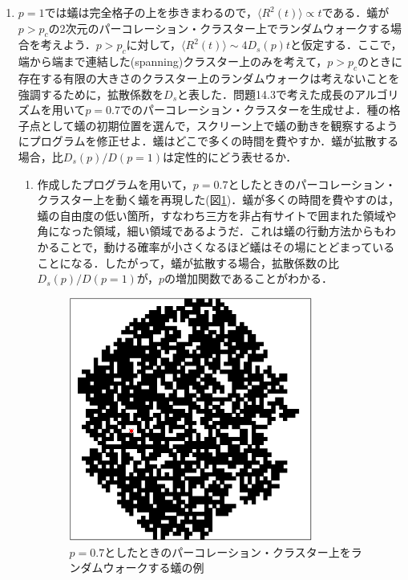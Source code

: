\documentclass{jsarticle}
\begin{document}
    \begin{enumerate}
        \renewcommand{\labelenumi}{\alph{enumi}.}
        \renewcommand{\labelenumii}{}
        
        \item $p=1$では蟻は完全格子の上を歩きまわるので，$\langle R^{2}(t) \rangle \propto t$である．蟻が$p>p_{c}$の2次元のパーコレーション・クラスター上でランダムウォークする場合を考えよう．$p>p_{c}$に対して，$\langle R^{2}(t) \rangle \sim 4D_{s}(p)t$と仮定する．ここで，端から端まで連結した(spanning)クラスター上のみを考えて，$p>p_{c}$のときに存在する有限の大きさのクラスター上のランダムウォークは考えないことを強調するために，拡散係数を$D_{s}$と表した．問題14.3で考えた成長のアルゴリズムを用いて$p=0.7$でのパーコレーション・クラスターを生成せよ．種の格子点として蟻の初期位置を選んで，スクリーン上で蟻の動きを観察するようにプログラムを修正せよ．蟻はどこで多くの時間を費やすか．蟻が拡散する場合，比$D_{s}(p)/D(p=1)$は定性的にどう表せるか．
            \begin{enumerate}
                \item 作成したプログラムを用いて，$p=0.7$としたときのパーコレーション・クラスター上を動く蟻を再現した(図\ref{fig:14-8-f1})．蟻が多くの時間を費やすのは，蟻の自由度の低い箇所，すなわち三方を非占有サイトで囲まれた領域や角になった領域，細い領域であるようだ．これは蟻の行動方法からもわかることで，動ける確率が小さくなるほど蟻はその場にとどまっていることになる．したがって，蟻が拡散する場合，拡散係数の比$D_{s}(p)/D(p=1)$が，$p$の増加関数であることがわかる．
                \begin{figure}[H]
                    \begin{center}
                        \includegraphics[width=8.0cm]{figure_1.pdf}
                        \caption{$p=0.7$としたときのパーコレーション・クラスター上をランダムウォークする蟻の例}
                        \label{fig:14-8-f1}
                    \end{center}
                \end{figure}
               

\end{enumerate}
\end{enumerate}
\end{document}
